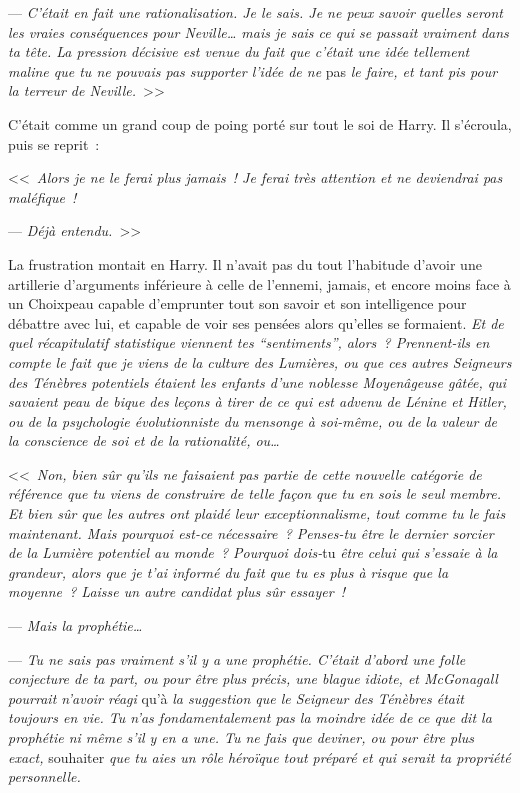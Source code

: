 --- \emph{C'était en fait une rationalisation. Je le sais. Je ne peux savoir quelles seront les vraies conséquences pour Neville… mais je sais ce qui se passait vraiment dans ta tête. La pression décisive est venue du fait que c'était une idée tellement maline que tu ne pouvais pas supporter l'idée de ne} pas \emph{le faire, et tant pis pour la terreur de Neville.}~>>

C'était comme un grand coup de poing porté sur tout le soi de Harry. Il s'écroula, puis se reprit~:

<<~\emph{Alors je ne le ferai plus jamais~! Je ferai très attention et ne deviendrai pas maléfique~!}

--- \emph{Déjà entendu.}~>>

La frustration montait en Harry. Il n'avait pas du tout l'habitude d'avoir une artillerie d'arguments inférieure à celle de l'ennemi, jamais, et encore moins face à un Choixpeau capable d'emprunter tout son savoir et son intelligence pour débattre avec lui, et capable de voir ses pensées alors qu'elles se formaient. \emph{Et de quel récapitulatif statistique viennent tes “sentiments”, alors~? Prennent-ils en compte le fait que je viens de la culture des Lumières, ou que ces autres Seigneurs des Ténèbres potentiels étaient les enfants d'une noblesse Moyenâgeuse gâtée, qui savaient peau de bique des leçons à tirer de ce qui est advenu de Lénine et Hitler, ou de la psychologie évolutionniste du mensonge à soi-même, ou de la valeur de la conscience de soi et de la rationalité, ou…}

<<~\emph{Non, bien sûr qu'ils ne faisaient pas partie de cette nouvelle catégorie de référence que tu viens de construire de telle façon que tu en sois le seul membre. Et bien sûr que les autres ont plaidé leur exceptionnalisme, tout comme tu le fais maintenant. Mais pourquoi est-ce nécessaire~? Penses-tu être le dernier sorcier de la Lumière potentiel au monde~? Pourquoi dois-}tu \emph{être celui qui s'essaie à la grandeur, alors que je t'ai informé du fait que tu es plus à risque que la moyenne~? Laisse un autre candidat plus sûr essayer~!}

--- \emph{Mais la prophétie…}

--- \emph{Tu ne sais pas vraiment s'il y a une prophétie. C'était d'abord une folle conjecture de ta part, ou pour être plus précis, une blague idiote, et McGonagall pourrait n'avoir réagi} qu'à \emph{la suggestion que le Seigneur des Ténèbres était toujours en vie. Tu n'as fondamentalement pas la moindre idée de ce que dit la prophétie ni même s'il y en a une. Tu ne fais que deviner, ou pour être plus exact,} souhaiter \emph{que tu aies un rôle héroïque tout préparé et qui serait ta propriété personnelle.}

